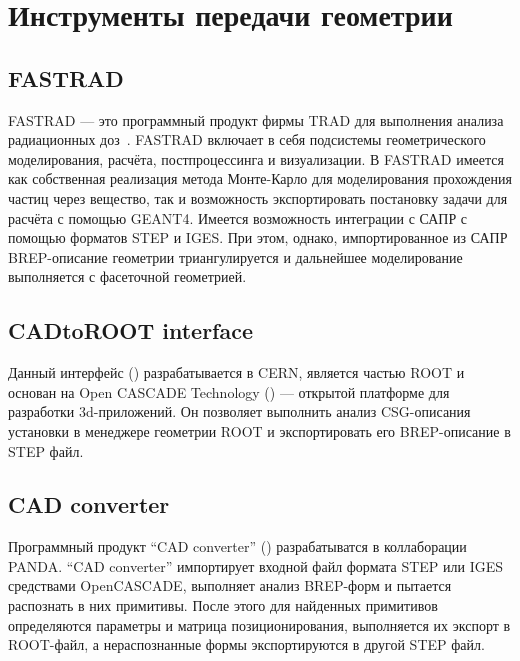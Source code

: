 \section{Инструменты передачи геометрии}\label{sec:ExistSols}

\subsection{FASTRAD}\label{sec:secFastrad}


FASTRAD --- это программный продукт фирмы TRAD для выполнения анализа радиационных доз~\cite{FASTRAD}.
FASTRAD включает в себя подсистемы геометрического моделирования, расчёта, постпроцессинга и визуализации.
В FASTRAD имеется как собственная реализация метода Монте-Карло для моделирования прохождения частиц через вещество, так и возможность экспортировать постановку задачи для расчёта с помощью GEANT4.
Имеется возможность интеграции с САПР с помощью форматов STEP и IGES. При этом, однако, импортированное из САПР BREP-описание геометрии триангулируется и дальнейшее моделирование выполняется с фасеточной геометрией.


\subsection{CADtoROOT interface}\label{sec:secCinzia}

Данный интерфейс (\cite{Cinzia}) разрабатывается в CERN, является частью ROOT и основан на Open CASCADE Technology (\cite{OCCtech}) --- открытой платформе для разработки 3d-приложений. Он позволяет выполнить анализ CSG-описания установки в менеджере геометрии ROOT и экспортировать его BREP-описание в STEP файл.

\subsection{CAD converter}\label{sec:secTobias}

Программный продукт ``CAD converter'' (\cite{Tobias}) разрабатыватся в коллаборации PANDA. ``CAD converter'' импортирует входной файл формата STEP или IGES средствами OpenCASCADE, выполняет анализ BREP-форм и пытается распознать в них примитивы. После этого для найденных примитивов определяются параметры и матрица позиционирования, выполняется их экспорт в ROOT-файл, а нераспознанные формы экспортируются в другой STEP файл.

